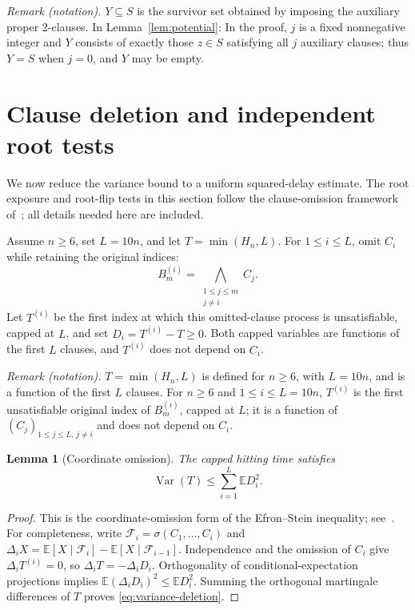 \documentclass[11pt]{article}
\newtheorem{lemma}[theorem]{Lemma}
\theoremstyle{remark}
\newcommand{\E}{\mathbb E}
\newcommand{\Var}{\operatorname{Var}}
\numberwithin{equation}{section}
\begin{document}
\noindent\textit{Remark (notation).} $Y\subseteq S$ is the survivor set obtained by imposing the auxiliary proper 2-clauses. In Lemma~\ref{lem:potential}: In the proof, $j$ is a fixed nonnegative integer and $Y$ consists of exactly those $z\in S$ satisfying all $j$ auxiliary clauses; thus $Y=S$ when $j=0$, and $Y$ may be empty.


\section{Clause deletion and independent root tests}
\label{sec:deletion}

We now reduce the variance bound to a uniform squared-delay estimate.
The root exposure and root-flip tests in this section follow the
clause-omission framework of~\cite[Section~3]{OpenAI2026Variance};
all details needed here are included.

Assume $n\ge6$, set $L=10n$, and let $T=\min(H_n,L)$.
For $1\le i\le L$, omit $C_i$ while retaining the original indices:
\[
 B_m^{(i)}=\bigwedge_{\substack{1\le j\le m\\j\ne i}} C_j.
\]
Let $T^{(i)}$ be the first index at which this omitted-clause process
is unsatisfiable, capped at $L$, and set $D_i=T^{(i)}-T\ge0$.
Both capped variables are functions of the first $L$ clauses, and
$T^{(i)}$ does not depend on $C_i$.

\noindent\textit{Remark (notation).} $T=\min(H_n,L)$ is defined for $n\ge6$, with $L=10n$, and is a function of the first $L$ clauses. For $n\ge6$ and $1\le i\le L=10n$, $T^{(i)}$ is the first unsatisfiable original index of $B_m^{(i)}$, capped at $L$; it is a function of $(C_j)_{1\le j\le L,\,j\ne i}$ and does not depend on $C_i$.


\begin{lemma}[Coordinate omission]
\label{lem:omission}
The capped hitting time satisfies
\begin{equation}
 \Var(T)\le\sum_{i=1}^L\E D_i^2.
 \label{eq:variance-deletion}
\end{equation}
\end{lemma}

\begin{proof}
This is the coordinate-omission form of the Efron--Stein inequality;
see~\cite[Section~3.2, Equation~(3.6)]{BBLM2005}.
For completeness, write $\mathcal F_i=\sigma(C_1,\ldots,C_i)$ and
$\Delta_i X=\E[X\mid\mathcal F_i]-\E[X\mid\mathcal F_{i-1}]$.
Independence and the omission of $C_i$ give $\Delta_i T^{(i)}=0$,
so $\Delta_i T=-\Delta_i D_i$.
Orthogonality of conditional-expectation projections implies
$\E(\Delta_i D_i)^2\le\E D_i^2$.
Summing the orthogonal martingale differences of $T$ proves
\eqref{eq:variance-deletion}.
\end{proof}
\end{document}
